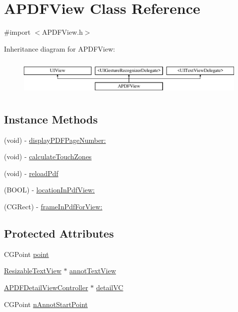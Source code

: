 \hypertarget{interface_a_p_d_f_view}{\section{A\-P\-D\-F\-View Class Reference}
\label{interface_a_p_d_f_view}
}


{\ttfamily \#import $<$A\-P\-D\-F\-View.\-h$>$}

Inheritance diagram for A\-P\-D\-F\-View\-:\begin{figure}[H]
\begin{center}
\leavevmode
\includegraphics[height=1.839080cm]{interface_a_p_d_f_view}
\end{center}
\end{figure}
\subsection*{Instance Methods}
\begin{DoxyCompactItemize}
\item 
(void) -\/ \hyperlink{interface_a_p_d_f_view_a097e7b5949840ef82bebdc9a97f23b5b}{display\-P\-D\-F\-Page\-Number\-:}
\item 
(void) -\/ \hyperlink{interface_a_p_d_f_view_aa2c8d3e49118a1d27aac472978d7f71d}{calculate\-Touch\-Zones}
\item 
(void) -\/ \hyperlink{interface_a_p_d_f_view_ab14445dadabad2c5dac6eea171fedb01}{reload\-Pdf}
\item 
(B\-O\-O\-L) -\/ \hyperlink{interface_a_p_d_f_view_a4811b01cc19eee5fcd53ff5f372c85e2}{location\-In\-Pdf\-View\-:}
\item 
(C\-G\-Rect) -\/ \hyperlink{interface_a_p_d_f_view_a73790d536206b98c40a57d25d8bad792}{frame\-In\-Pdf\-For\-View\-:}
\end{DoxyCompactItemize}
\subsection*{Protected Attributes}
\begin{DoxyCompactItemize}
\item 
C\-G\-Point \hyperlink{interface_a_p_d_f_view_afb6689ca57c46c09d6a37a7c60ae5f52}{point}
\item 
\hyperlink{interface_resizable_text_view}{Resizable\-Text\-View} $\ast$ \hyperlink{interface_a_p_d_f_view_adba82d308f7f6629000643b288127725}{annot\-Text\-View}
\item 
\hyperlink{interface_a_p_d_f_detail_view_controller}{A\-P\-D\-F\-Detail\-View\-Controller} $\ast$ \hyperlink{interface_a_p_d_f_view_ad613f45976958c923fad11d2a37f3e2e}{detail\-V\-C}
\item 
C\-G\-Point \hyperlink{interface_a_p_d_f_view_aa1a5d0930fcd5aeebcbcead8fdf9ce6f}{n\-Annot\-Start\-Point}
\end{DoxyCompactItemize}
